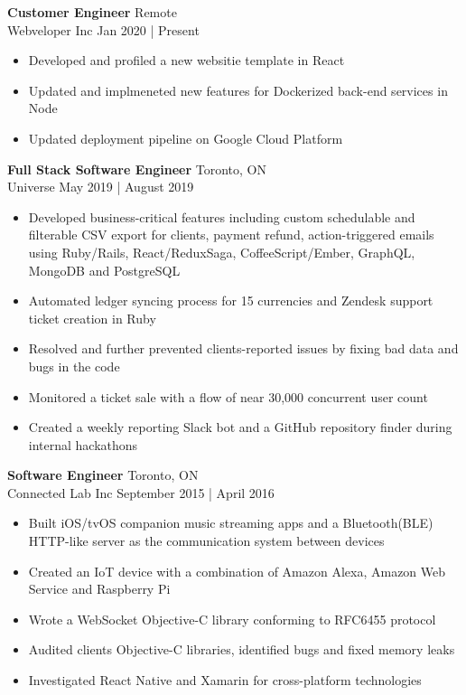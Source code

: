 \documentclass[a4paper]{article}
\begin{document}
\textbf{\normalsize Customer Engineer} \hfill Remote\\
\textcolor{jobGray}{Webveloper Inc} \hfill \textcolor{dateGray}{Jan 2020 | Present}\\
\vspace{-2mm}
\begin{itemize}[leftmargin=1cm ] \itemsep -0.5pt
	\item Developed and profiled a new websitie template in React
	\item Updated and implmeneted new features for Dockerized back-end services in Node
	\item Updated deployment pipeline on Google Cloud Platform
\end{itemize}
\textbf{\normalsize Full Stack Software Engineer} \hfill Toronto, ON\\
\textcolor{jobGray}{Universe} \hfill \textcolor{dateGray}{May 2019 | August 2019}\\
\vspace{-2mm}
\begin{itemize}[leftmargin=1cm ] \itemsep -0.5pt
	\item Developed business-critical features including custom schedulable and filterable CSV export for clients, payment refund, action-triggered emails using Ruby/Rails, React/ReduxSaga, CoffeeScript/Ember, GraphQL, MongoDB and PostgreSQL  
	\item Automated ledger syncing process for 15 currencies and Zendesk support ticket creation in Ruby
	\item Resolved and further prevented clients-reported issues by fixing bad data and bugs in the code
	\item Monitored a ticket sale with a flow of near 30,000 concurrent user count
	\item Created a weekly reporting Slack bot and a GitHub repository finder during internal hackathons 
\end{itemize}
\textbf{\normalsize Software Engineer} \hfill Toronto, ON\\ 
\textcolor{jobGray}{Connected Lab Inc} \hfill \textcolor{dateGray}{September 2015 | April 2016}\\
\vspace{-2mm}
\begin{itemize}[leftmargin=1cm ] \itemsep -0.5pt
	\item Built iOS/tvOS companion music streaming apps and a Bluetooth(BLE) HTTP-like server as the communication system between devices
	\item Created an IoT device with a combination of Amazon Alexa, Amazon Web Service and Raspberry Pi
	\item Wrote a WebSocket Objective-C library conforming to RFC6455 protocol
	\item Audited client\textquotesingle{}s Objective-C libraries, identified bugs and fixed memory leaks 
	\item Investigated React Native and Xamarin for cross-platform technologies
\end{itemize}
\end{document}

